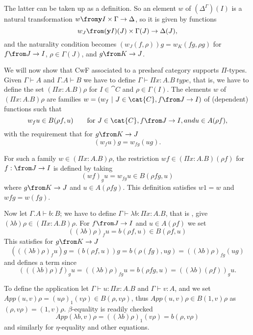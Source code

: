 The latter can be taken up as a definition. So an element $w$ of
$(\Delta^\Gamma)(I)$ is a natural transformation $w \from \mathbf{y}I\times
\Gamma \to \Delta$, so it is given by functions
\[
  w_J \from (\mathbf{y}I)(J) \times \Gamma(J) \to \Delta(J),
\]
and the naturality condition becomes $(w_J(f, \rho))g = w_K(fg, \rho g)$ for $f
\from J \to I$, $\rho \in \Gamma(J)$, and $g \from K \to J$.

We will now show that CwF associated to a presheaf category supports
$\Pi$-types. Given $\Gamma \vdash A$ and $\Gamma.A \vdash B$ we have to define
$\Gamma \vdash \Pi x: A. B~type$, that is, we have to define the set $(\Pi x:
A.B) \rho$ for $I \in \cat{C}$ and $\rho \in \Gamma(I)$. The elements $w$ of
$(\Pi x:A.B)\rho$ are families $w = (w_f~|~J\in \cat{C}, f \from J \to I)$ of
(dependent) functions such that
\[
  w_f u \in B(\rho f, u) \qquad \text{for $J \in \cat{C}, f \from J \to I, and u \in A(\rho f)$},
\]
with the requirement that for $g \from K \to J$
\[
  (w_f u)g = w_{fg}(ug).
\]

For such a family $w \in (\Pi x: A. B)\rho$, the restriction $wf \in (\Pi
x:A.B)(\rho f)$ for $f: \from J \to I$ is defined by taking
\[
  (w f)_g u = w_{fg}u \in B(\rho f g, u)
\]
where $g \from K \to J$ and $u \in A(\rho f g)$. This definition satisfies $w 1
= w$ and $w f g = w(f g)$.

Now let $\Gamma.A \vdash b : B$; we have to define $\Gamma \vdash \lambda b :
\Pi x:A.B$, that is , give $(\lambda b)\rho \in (\Pi x:A.B)\rho$. For $f \from
J \to I$ and $u \in A(\rho f)$ we set
\[
  ((\lambda b)\rho)_f u = b (\rho f, u) \in B(\rho f, u)
\]
This satisfies for $g \from K \to J$
\[
  (((\lambda b)\rho)_f u)g = (b(\rho f, u))g = b(\rho(fg), ug) = ((\lambda b)\rho)_{fg}(ug)
\]
and defines a term since
\[
  (((\lambda b)\rho)f)_g u = ((\lambda b) \rho)_{fg} u = b(\rho fg, u) = ((\lambda b)(\rho f))_g u.
\]

To define the application let $\Gamma \vdash u : \Pi x:A.B$ and $\Gamma \vdash
v : A$, and we set $App(u, v)\rho = (u\rho)_1 (v\rho) \in B(\rho, v\rho)$, thus
$App(u, v)\rho \in B(1, v)\rho$ as $(\rho, v \rho) = (1, v)\rho$.
$\beta$-equality is readily checked
\[
  App(\lambda b, v)\rho = ((\lambda b)\rho)_1(v\rho)=b(\rho, v\rho)
\]
and similarly for $\eta$-equality and other equations.

